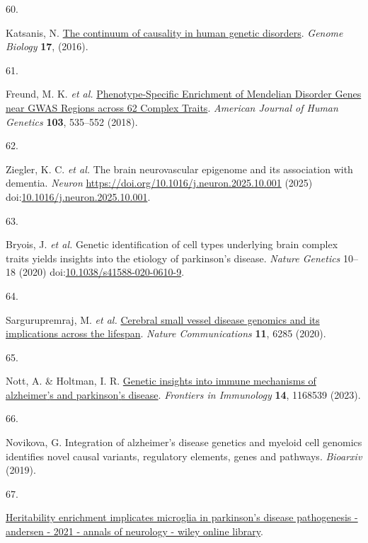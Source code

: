 \documentclass[
]{article}
\newlength{\cslhangindent}
\newlength{\csllabelwidth}
\newenvironment{CSLReferences}[2] %
 {\begin{list}{}{%
  \setlength{\itemindent}{0pt}
  \setlength{\leftmargin}{0pt}
  \setlength{\parsep}{0pt}
  \ifodd #1
   \setlength{\leftmargin}{\cslhangindent}
   \setlength{\itemindent}{-1\cslhangindent}
  \fi
  \setlength{\itemsep}{#2\baselineskip}}}
 {\end{list}}
\newcommand{\CSLLeftMargin}[1]{\parbox[t]{\csllabelwidth}{\strut#1\strut}}
\newcommand{\CSLRightInline}[1]{\parbox[t]{\linewidth - \csllabelwidth}{\strut#1\strut}}
\begin{document}
\begin{CSLReferences}{0}{0}
\CSLLeftMargin{60. }%
\CSLRightInline{Katsanis, N.
\href{https://doi.org/10.1186/s13059-016-1107-9}{The continuum of
causality in human genetic disorders}. \emph{Genome Biology}
\textbf{17}, (2016).}

\CSLLeftMargin{61. }%
\CSLRightInline{Freund, M. K. \emph{et al.}
\href{https://doi.org/10.1016/j.ajhg.2018.08.017}{Phenotype-Specific
Enrichment of Mendelian Disorder Genes near GWAS Regions across 62
Complex Traits}. \emph{American Journal of Human Genetics} \textbf{103},
535--552 (2018).}

\CSLLeftMargin{62. }%
\CSLRightInline{Ziegler, K. C. \emph{et al.} The brain neurovascular
epigenome and its association with dementia. \emph{Neuron}
\url{https://doi.org/10.1016/j.neuron.2025.10.001} (2025)
doi:\href{https://doi.org/10.1016/j.neuron.2025.10.001}{10.1016/j.neuron.2025.10.001}.}

\CSLLeftMargin{63. }%
\CSLRightInline{Bryois, J. \emph{et al.} Genetic identification of cell
types underlying brain complex traits yields insights into the etiology
of parkinson{'}s disease. \emph{Nature Genetics} 10--18 (2020)
doi:\href{https://doi.org/10.1038/s41588-020-0610-9}{10.1038/s41588-020-0610-9}.}

\CSLLeftMargin{64. }%
\CSLRightInline{Sargurupremraj, M. \emph{et al.}
\href{https://doi.org/10.1038/s41467-020-19111-2}{Cerebral small vessel
disease genomics and its implications across the lifespan}. \emph{Nature
Communications} \textbf{11}, 6285 (2020).}

\CSLLeftMargin{65. }%
\CSLRightInline{Nott, A. \& Holtman, I. R.
\href{https://doi.org/10.3389/fimmu.2023.1168539}{Genetic insights into
immune mechanisms of alzheimer{'}s and parkinson{'}s disease}.
\emph{Frontiers in Immunology} \textbf{14}, 1168539 (2023).}

\CSLLeftMargin{66. }%
\CSLRightInline{Novikova, G. Integration of alzheimer's disease genetics
and myeloid cell genomics identifies novel causal variants, regulatory
elements, genes and pathways. \emph{Bioarxiv} (2019).}

\CSLLeftMargin{67. }%
\CSLRightInline{\href{https://onlinelibrary.wiley.com/doi/10.1002/ana.26032}{Heritability
enrichment implicates microglia in parkinson's disease pathogenesis -
andersen - 2021 - annals of neurology - wiley online library}.}


\end{CSLReferences}
\end{document}
